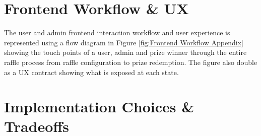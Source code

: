 \documentclass{article}
\begin{document}
\section{Frontend Workflow \& UX}
The user and admin frontend interaction workflow and user experience is represented using a flow diagram in Figure \ref{fig:Frontend Workflow Appendix} showing the touch points of a user, admin and prize winner through the entire raffle process from raffle configuration to prize redemption. The figure also double as a UX contract showing what is exposed at each state.

\section{Implementation Choices \& Tradeoffs}
\end{document}
